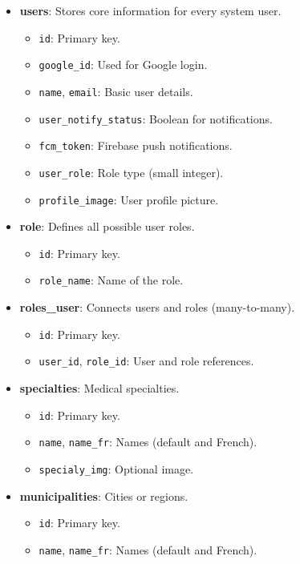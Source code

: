 \documentclass[12pt]{report}
\begin{document}
\begin{itemize}

	\item \textbf{users}: Stores core information for every system user.
	      \begin{itemize}
		      \item \texttt{id}: Primary key.
		      \item \texttt{google\_id}: Used for Google login.
		      \item \texttt{name}, \texttt{email}: Basic user details.
		      \item \texttt{user\_notify\_status}: Boolean for notifications.
		      \item \texttt{fcm\_token}: Firebase push notifications.
		      \item \texttt{user\_role}: Role type (small integer).
		      \item \texttt{profile\_image}: User profile picture.
	      \end{itemize}

	\item \textbf{role}: Defines all possible user roles.
	      \begin{itemize}
		      \item \texttt{id}: Primary key.
		      \item \texttt{role\_name}: Name of the role.
	      \end{itemize}

	\item \textbf{roles\_user}: Connects users and roles (many-to-many).
	      \begin{itemize}
		      \item \texttt{id}: Primary key.
		      \item \texttt{user\_id}, \texttt{role\_id}: User and role references.
	      \end{itemize}

	\item \textbf{specialties}: Medical specialties.
	      \begin{itemize}
		      \item \texttt{id}: Primary key.
		      \item \texttt{name}, \texttt{name\_fr}: Names (default and French).
		      \item \texttt{specialy\_img}: Optional image.
	      \end{itemize}

	\item \textbf{municipalities}: Cities or regions.
	      \begin{itemize}
		      \item \texttt{id}: Primary key.
		      \item \texttt{name}, \texttt{name\_fr}: Names (default and French).
	      \end{itemize}


\end{itemize}
\end{document}

